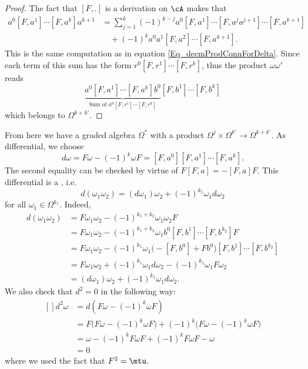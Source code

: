 \begin{proof}
	The fact that $[F,.]$ is a derivation on $\cA$ makes that
	\[
		\begin{split}
			a^0[F,a^1]\cdots[F,a^{k}]a^{k+1}&=\sum_{j=1}^{k}(-1)^{k-j}a^0[F,a^1]\cdots[F,a^{j}a^{j+1}]\cdots[F,a^{k+1}]\\
			&\quad+(-1)^ka^0a^1[F,a^2]\cdots[F,a^{k+1}].
		\end{split}
	\]
	This is the same computation as in equation \eqref{Eq_decmProdConnForDelta}. Since each term of this sum has the form $r^0[F,r^1]\cdots[F,r^k]$, thus the product $\omega\omega'$ reads
	\[
		\underbrace{a^0[F,a^1]\cdots[F,a^{k}]b^0}_{\textrm{Sum of }a^0[F,r^1]\cdots[F,r^k]}[F,b^1]\cdots[F,b^k]
	\]
	which belongs to $\Omega^{k+k'}$.
\end{proof}
From here we have a graded algebra $\Omega^*$ with a product $\Omega^j\times\Omega^{k'}\to\Omega^{k+k'}$. As differential, we choose
\begin{equation}  \label{EqFreddDefbel}
	d\omega=F\omega-(-1)^k\omega F=[F,a^0][F,a^1]\cdots[F,a^{k}].
\end{equation}
The second equality can be checked by virtue of $F[F,a]=-[F,a]F$. This differential is a , i.e.
\begin{equation}
	d(\omega_1\omega_2)=(d\omega_1)\omega_2+(-1)^{k_1}\omega_1d\omega_2
\end{equation}
for all $\omega_1\in\Omega^{k_1}$. Indeed,
\[
	\begin{split}
		d(\omega_1\omega_2)&=F\omega_1\omega_2-(-1)^{k_1+k_2}\omega_1\omega_2 F\\
		&=F\omega_1\omega_2-(-1)^{k_1+k_2}\omega_1b^0[F,b^1]\cdots[F,b^{k_2}]F\\
		&=F\omega_1\omega_2-(-1)^{k_1}\omega_1\big( -[F,b^0]+Fb^0 \big)[F,b^1]\cdots[F,b^{k_2}]\\
		&=F\omega_1\omega_2+(-1)^{k_1}\omega_1d\omega_2-(-1)^{k_1}\omega_1 F\omega_2\\
		&=(d\omega_1)\omega_2+(-1)^{k_1}\omega_1 d\omega_2.
	\end{split}
\]
We also check that $d^2=0$ in the following way:
\begin{equation}
	\begin{aligned}[]
		d^2\omega & =d(F\omega-(-1)^k\omega F)                                                      \\
		          & =F\big( F\omega-(-1)^k\omega F \big)+(-1)^{k}\big( F\omega-(-1)^k\omega F \big) \\
		          & =\omega-(-1)^kF\omega F+(-1)^k F\omega F-\omega                                 \\
		          & =0
	\end{aligned}
\end{equation}
where we used the fact that $F^2=\mtu$.

